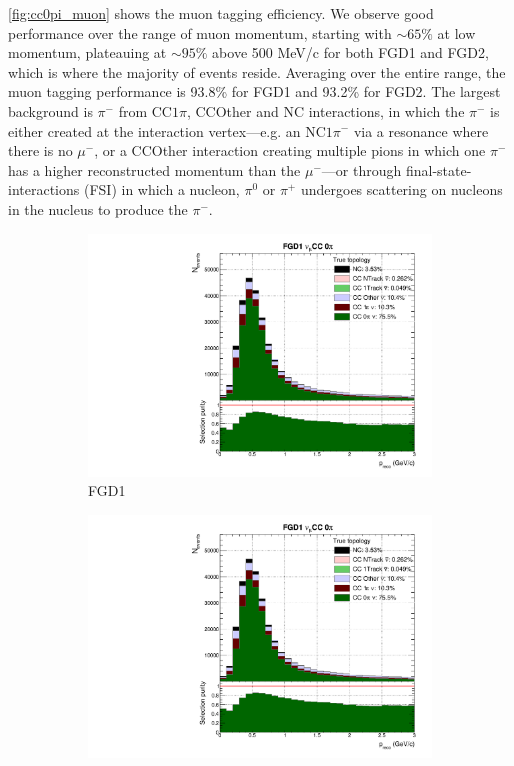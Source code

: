\autoref{fig:cc0pi_muon} shows the muon tagging efficiency. We observe good performance over the range of muon momentum, starting with $\sim65\%$ at low momentum, plateauing at $\sim95\%$ above 500 MeV/c for both FGD1 and FGD2, which is where the majority of events reside. Averaging over the entire range, the muon tagging performance is 93.8\% for FGD1 and 93.2\% for FGD2. The largest background is $\pi^-$ from CC$1\pi$, CCOther and NC interactions, in which the $\pi^-$ is either created at the interaction vertex---e.g. an NC$1\pi^-$ via a resonance where there is no $\mu^-$, or a CCOther interaction creating multiple pions in which one $\pi^-$ has a higher reconstructed momentum than the $\mu^-$---or through final-state-interactions (FSI) in which a nucleon, $\pi^0$ or $\pi^+$ undergoes scattering on nucleons in the nucleus to produce the $\pi^-$.
\begin{figure}[!h]
	\begin{subfigure}[t]{0.49\textwidth}
		\includegraphics[width=\textwidth,page=2, trim={0mm 0mm 0mm 9mm}, clip]{figures/mach3/selection/2017b_Diag_WithSelection}
		\caption{FGD1}
	\end{subfigure}
	\begin{subfigure}[t]{0.49\textwidth}
		\includegraphics[width=\textwidth,page=8, trim={0mm 0mm 0mm 9mm}, clip]{figures/mach3/selection/2017b_Diag_WithSelection}

\end{subfigure}
\end{figure}
